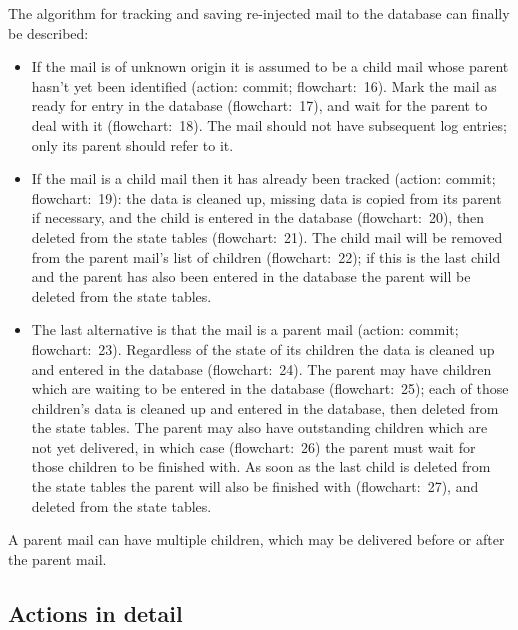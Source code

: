 \documentclass[a4paper,12pt,draft]{article}
\begin{document}
The algorithm for tracking and saving re-injected mail to the database can
finally be described:

\begin{itemize}

    \item If the mail is of unknown origin it is assumed to be a child mail
        whose parent hasn't yet been identified (action: commit;
        flowchart:~16).  Mark the mail as ready for entry in the database
        (flowchart:~17), and wait for the parent to deal with it
        (flowchart:~18).  The mail should not have subsequent log entries;
        only its parent should refer to it.

    \item If the mail is a child mail then it has already been tracked
        (action: commit; flowchart:~19): the data is cleaned up, missing
        data is copied from its parent if necessary, and the child is
        entered in the database (flowchart:~20), then deleted from the
        state tables (flowchart:~21).  The child mail will be removed from
        the parent mail's list of children (flowchart:~22); if this is the
        last child and the parent has also been entered in the database the
        parent will be deleted from the state tables.

    \item The last alternative is that the mail is a parent mail (action:
        commit; flowchart:~23).  Regardless of the state of its children
        the data is cleaned up and entered in the database (flowchart:~24).
        The parent may have children which are waiting to be entered in the
        database (flowchart:~25); each of those children's data is cleaned
        up and entered in the database, then deleted from the state tables.
        The parent may also have outstanding children which are not yet
        delivered, in which case (flowchart:~26) the parent must wait for
        those children to be finished with.  As soon as the last child is
        deleted from the state tables the parent will also be finished with
        (flowchart:~27), and deleted from the state tables.

\end{itemize}

A parent mail can have multiple children, which may be delivered before or
after the parent mail.  

\subsection{Actions in detail}
\end{document}
